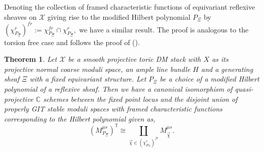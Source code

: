 \documentclass[10pt]{amsart}
\newtheorem{thm}[prop]{Theorem}
\newcommand{\sX}{{\mathcal X}}
\numberwithin{equation}{subsection}
\begin{document}
Denoting the collection of framed characteristic functions of equivariant reflexive sheaves on $\sX$ giving rise to the modified Hilbert polynomial $P_{\Xi}$ by $(\chi^{r}_{P_{\Xi}})^{fr}:=\chi^{fr}_{P_{\Xi}}\cap \chi^r_{P_{\Xi}},$ we have a similar result. The proof is analogous to the torsion free case and follows the proof of (\cite{Koo2}).
\begin{thm}\label{Final2}
Let $\sX$ be a smooth projective toric DM stack with $X$ as its projective normal coarse moduli space, an ample line bundle $H$ and a generating sheaf $\Xi$ with a fixed equivariant structure. Let $P_{\Xi}$ be a choice of a modified Hilbert polynomial of a reflexive sheaf. Then we have a canonical isomorphism of quasi-projective $\mathbb C$ schemes between the fixed point locus and the disjoint union of properly GIT stable moduli spaces with framed characteristic functions corresponding to the Hilbert polynomial given as,
$$(M^{\mu s}_{P_{\Xi}})^{\mathbb T} \cong \coprod \limits_{\vec\chi\in (\chi^r_{P_{\Xi}})^{fr}}M^{\mu s}_{\vec\chi}.$$
\end{thm}
\end{document}
